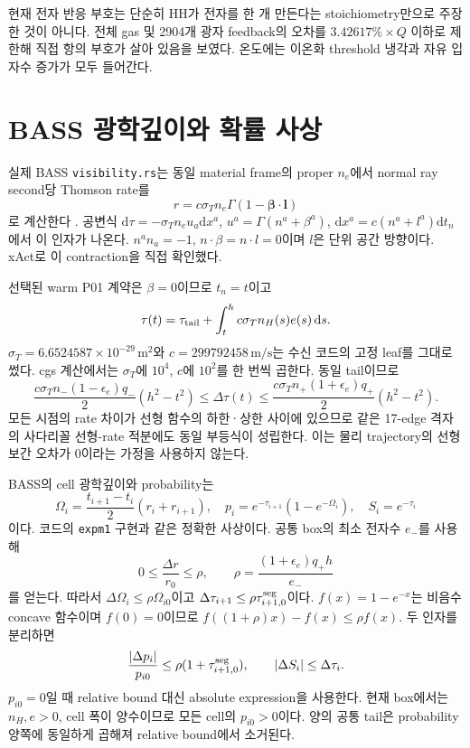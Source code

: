 \documentclass[11pt,a4paper]{article}
\newcommand{\dd}{\mathrm d}\newcommand{\HH}{\mathrm{HH}}\newcommand{\eV}{\mathrm{eV}}
\begin{document}
현재 전자 반응 부호는 단순히 HH가 전자를 한 개 만든다는 stoichiometry만으로 주장한 것이 아니다. 전체 gas 및 2904개 광자 feedback의 오차를 $3.42617\%\times Q$ 이하로 제한해 직접 항의 부호가 살아 있음을 보였다. 온도에는 이온화 threshold 냉각과 자유 입자수 증가가 모두 들어간다.

\newpage
\section{BASS 광학깊이와 확률 사상}
\label{sec:receiver}
실제 BASS \texttt{visibility.rs}는 동일 material frame의 proper $n_e$에서 normal ray second당 Thomson rate를
\begin{equation}
r=c\sigma_Tn_e\Gamma(1-\bm\beta\cdot\bm l)
\end{equation}
로 계산한다 \cite{bass}. 공변식 $\dd\tau=-\sigma_Tn_eu_a\dd x^a$, $u^a=\Gamma(n^a+\beta^a)$, $\dd x^a=c(n^a+l^a)\dd t_n$에서 이 인자가 나온다. $n^an_a=-1$, $n\cdot\beta=n\cdot l=0$이며 $l$은 단위 공간 방향이다. xAct로 이 contraction을 직접 확인했다.

선택된 warm P01 계약은 $\beta=0$이므로 $t_n=t$이고
\begin{equation}
\tau(t)=\tau_{\rm tail}+\int_t^h c\sigma_Tn_H(s)e(s)\,\dd s.
\end{equation}
$\sigma_T=6.6524587\times10^{-29}\,\mathrm{m^2}$와 $c=299792458\,\mathrm{m/s}$는 수신 코드의 고정 leaf를 그대로 썼다. cgs 계산에서는 $\sigma_T$에 $10^4$, $c$에 $10^2$를 한 번씩 곱한다. 동일 tail이므로
\begin{equation}
\frac{c\sigma_T n_-(1-\epsilon_e)q_-}{2}(h^2-t^2)
\le\Delta\tau(t)\le
\frac{c\sigma_T n_+(1+\epsilon_e)q_+}{2}(h^2-t^2).
\end{equation}
모든 시점의 rate 차이가 선형 함수의 하한·상한 사이에 있으므로 같은 17-edge 격자의 사다리꼴 선형-rate 적분에도 동일 부등식이 성립한다. 이는 물리 trajectory의 선형 보간 오차가 0이라는 가정을 사용하지 않는다.

BASS의 cell 광학깊이와 probability는
\begin{equation}
\Omega_i=\frac{t_{i+1}-t_i}{2}(r_i+r_{i+1}),\quad
p_i=e^{-\tau_{i+1}}(1-e^{-\Omega_i}),\quad S_i=e^{-\tau_i}
\end{equation}
이다. 코드의 \texttt{expm1} 구현과 같은 정확한 사상이다. 공통 box의 최소 전자수 $e_-$를 사용해
\begin{equation}
0\le\frac{\Delta r}{r_0}\le\rho,
\qquad \rho=\frac{(1+\epsilon_e)q_+h}{e_-}
\end{equation}
를 얻는다. 따라서 $\Delta\Omega_i\le\rho\Omega_{i0}$이고 $\Delta\tau_{i+1}\le\rho\tau_{i+1,0}^{\rm seg}$이다. $f(x)=1-e^{-x}$는 비음수 concave 함수이며 $f(0)=0$이므로 $f((1+\rho)x)-f(x)\le\rho f(x)$. 두 인자를 분리하면
\begin{equation}\label{eq:prob}
\frac{|\Delta p_i|}{p_{i0}}\le\rho(1+\tau_{i+1,0}^{\rm seg}),
\qquad |\Delta S_i|\le\Delta\tau_i.
\end{equation}
$p_{i0}=0$일 때 relative bound 대신 absolute expression을 사용한다. 현재 box에서는 $n_H,e>0$, cell 폭이 양수이므로 모든 cell의 $p_{i0}>0$이다. 양의 공통 tail은 probability 양쪽에 동일하게 곱해져 relative bound에서 소거된다.
\end{document}
